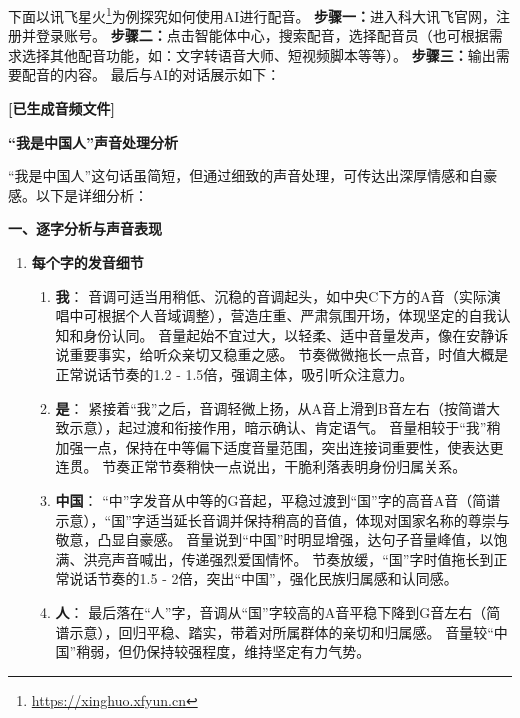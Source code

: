 下面以讯飞星火\footnote{\url{https://xinghuo.xfyun.cn}}为例探究如何使用AI进行配音。
\textbf{步骤一：}进入科大讯飞官网，注册并登录账号。
\textbf{步骤二：}点击智能体中心，搜索配音，选择配音员（也可根据需求选择其他配音功能，如：文字转语音大师、短视频脚本等等）。
\textbf{步骤三：}输出需要配音的内容。
最后与AI的对话展示如下：


\begin{gptbox}
\footnotesize{
    \textbf{[已生成音频文件]}

    \textbf{“我是中国人”声音处理分析}

    “我是中国人”这句话虽简短，但通过细致的声音处理，可传达出深厚情感和自豪感。以下是详细分析：

    \textbf{一、逐字分析与声音表现}
    \begin{enumerate}
        \item \textbf{每个字的发音细节}
              \begin{enumerate}
                  \item \textbf{我}：
                        音调可适当用稍低、沉稳的音调起头，如中央C下方的A音（实际演唱中可根据个人音域调整），营造庄重、严肃氛围开场，体现坚定的自我认知和身份认同。
                        音量起始不宜过大，以轻柔、适中音量发声，像在安静诉说重要事实，给听众亲切又稳重之感。
                        节奏微微拖长一点音，时值大概是正常说话节奏的1.2 - 1.5倍，强调主体，吸引听众注意力。
                  \item \textbf{是}：
                        紧接着“我”之后，音调轻微上扬，从A音上滑到B音左右（按简谱大致示意），起过渡和衔接作用，暗示确认、肯定语气。
                        音量相较于“我”稍加强一点，保持在中等偏下适度音量范围，突出连接词重要性，使表达更连贯。
                        节奏正常节奏稍快一点说出，干脆利落表明身份归属关系。
                  \item \textbf{中国}：
                        “中”字发音从中等的G音起，平稳过渡到“国”字的高音A音（简谱示意），“国”字适当延长音调并保持稍高的音值，体现对国家名称的尊崇与敬意，凸显自豪感。
                        音量说到“中国”时明显增强，达句子音量峰值，以饱满、洪亮声音喊出，传递强烈爱国情怀。
                        节奏放缓，“国”字时值拖长到正常说话节奏的1.5 - 2倍，突出“中国”，强化民族归属感和认同感。
                  \item \textbf{人}：
                        最后落在“人”字，音调从“国”字较高的A音平稳下降到G音左右（简谱示意），回归平稳、踏实，带着对所属群体的亲切和归属感。
                        音量较“中国”稍弱，但仍保持较强程度，维持坚定有力气势。

\end{enumerate}
\end{enumerate}}
\end{gptbox}

